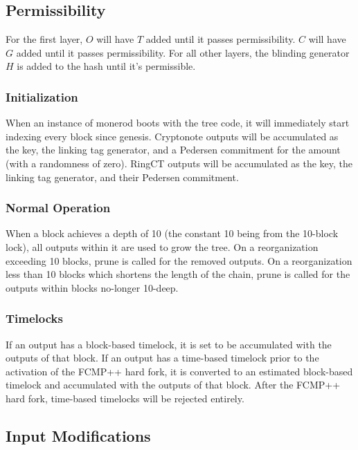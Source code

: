 \documentclass[]{article}
\begin{document}
\subsection{Permissibility}

For the first layer, $O$ will have $T$ added until it passes permissibility. $C$ will have $G$ added until it passes permissibility. For all other layers, the blinding generator $H$ is added to the hash until it's permissible.

\subsubsection{Initialization}

When an instance of monerod boots with the tree code, it will immediately start indexing every block since genesis. Cryptonote outputs will be accumulated as the key, the linking tag generator, and a Pedersen commitment for the amount (with a randomness of zero). RingCT outputs will be accumulated as the key, the linking tag generator, and their Pedersen commitment.

\subsubsection{Normal Operation}

When a block achieves a depth of 10 (the constant 10 being from the 10-block lock), all outputs within it are used to grow the tree. On a reorganization exceeding 10 blocks, prune is called for the removed outputs. On a reorganization less than 10 blocks which shortens the length of the chain, prune is called for the outputs within blocks no-longer 10-deep.

\subsubsection{Timelocks}

If an output has a block-based timelock, it is set to be accumulated with the outputs of that block. If an output has a time-based timelock prior to the activation of the FCMP++ hard fork, it is converted to an estimated block-based timelock and accumulated with the outputs of that block. After the FCMP++ hard fork, time-based timelocks will be rejected entirely.

\subsection{Input Modifications}
\end{document}
